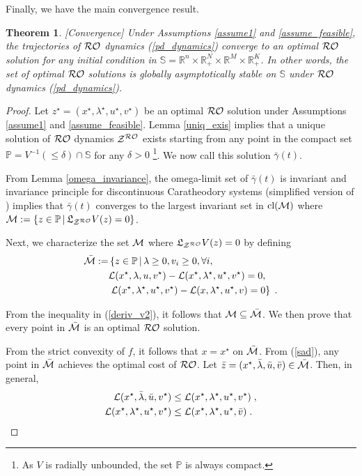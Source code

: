 \documentclass[journal,twoside,web]{ieeecolor}
\newtheorem{theorem}{Theorem}
\begin{document}
Finally, we have the main convergence result. 
\begin{theorem} \label{maintheorem} [Convergence] 
Under Assumptions \ref{assume1} and \ref{assume_feasible}, the trajectories of ${\cal RO}$ dynamics (\ref{pd_dynamics}) converge to an optimal ${\cal RO}$ solution for any initial condition in $\mathbb{S}=\mathbb{R}^n\times \mathbb{R}^N_{+}\times \mathbb{R}^M\times \mathbb{R}^K_+$. In other words, the set of optimal ${\cal RO}$ solutions is globally asymptotically stable on $\mathbb{S}$ under ${\cal RO}$ dynamics (\ref{pd_dynamics}).
\end{theorem}
\begin{proof}
Let $z^\star=(x^\star,\lambda^\star,u^\star,v^\star)$ be an optimal ${\cal RO}$ solution under Assumptions \ref{assume1} and \ref{assume_feasible}. Lemma \ref{uniq_exis} implies that a unique solution of ${\cal RO}$ dynamics ${\cal Z}^{\cal RO}$ exists starting from any point in the compact set $\mathbb P=V^{-1}(\leq \delta) \cap \mathbb S$ for any $\delta>0$ \footnote{As $V$ is radially unbounded, the set $\mathbb P$ is always compact.}. We now call this solution $\bar \gamma(t)$.

From Lemma \ref{omega_invariance}, the omega-limit set of $\bar \gamma(t)$ is invariant and invariance principle for discontinuous Caratheodory systems \cite[Proposition~2.1]{cherukuri2016} (simplified version of \cite[Proposition~3]{bacciotti2006nonpathological}) implies that $\bar \gamma(t)$ converges to the largest invariant set in $\text{cl}({\cal M})$ where ${\cal M}:=\{z \in \mathbb P\,|\, \mathfrak{L}_{{\cal Z}^{\cal RO}}V(z)=0\}$.

Next, we characterize the set ${\cal M}$ where $\mathfrak{L}_{{\cal Z}^{\cal RO}}V(z)=0$ by defining
\begin{align}
\bar{\cal M}:=& \left\{z \in \mathbb P\,\middle|\,\lambda\geq 0, v_i\geq 0, \forall i, \right. \nonumber\\
&{\cal L}(x^\star,\lambda,u,v^\star)-{\cal L}(x^\star,\lambda^\star,u^\star,v^\star)=0, \nonumber\\
&\left. {\cal L}(x^\star,\lambda^\star,u^\star,v^\star)-{\cal L}(x,\lambda^\star,u^\star,v)=0 \right\}\;.\label{sad}
\end{align}

From the inequality in (\ref{deriv_v2}), it follows that ${\cal M} \subseteq \bar{\cal M}$. We then prove that every point in $\bar{\cal M}$ is an optimal ${\cal RO}$ solution.

From the strict convexity of $f$, it follows that $x=x^\star$ on $\bar{\cal M}$. From (\ref{sad}), any point in $\bar{\cal M}$ achieves the optimal cost of ${\cal RO}$. Let $\bar{z}=(x^\star,\bar{\lambda},\bar{u},\bar{v})\in \bar{\cal M}$\;. Then, in general, 
\begin{align*}
    {\cal L}(x^\star,\bar{\lambda},\bar{u},v^\star) &\leq {\cal L}(x^\star,\lambda^\star,u^\star,v^\star)\;, \\
    {\cal L}(x^\star,\lambda^\star,u^\star,v^\star) &\leq {\cal L}(x^\star,\lambda^\star,u^\star,\bar{v})\;.
\end{align*}


\end{proof}
\end{document}
